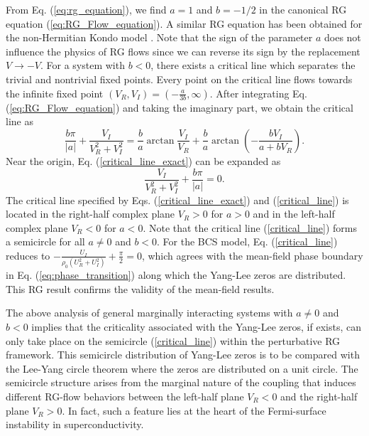 \documentclass[aps,prl,twocolumn,superscriptaddress]{revtex4-1}
\begin{document}
From Eq. (\ref{eq:rg_equation}), we find $a=1$ and $b=-1/2$ in
the canonical RG equation (\ref{eq:RG_Flow_equation}). A similar RG
equation has been obtained for the non-Hermitian Kondo model \cite{Nakagawa2018}.
Note that the sign of the parameter $a$ does not influence the physics
of RG flows since we can reverse its sign by the replacement $V\to-V$.
For a system with $b<0$, there exists a critical line which separates
the trivial and nontrivial fixed points. Every point on the critical
line flows towards the infinite fixed point $(V_{R},V_{I})=(-\frac{a}{3b},\infty)$.
After integrating Eq. (\ref{eq:RG_Flow_equation}) and taking the
imaginary part, we obtain the critical line as
\begin{equation}
\frac{b\pi}{|a|}+\frac{V_{I}}{V_{R}^{2}+V_{I}^{2}}=\frac{b}{a}\arctan{\frac{V_{I}}{V_{R}}}+\frac{b}{a}\arctan{(-\frac{bV_{I}}{a+bV_{R}})}.\label{critical_line_exact}
\end{equation}
Near the origin, Eq. (\ref{critical_line_exact}) can be expanded
as 
\begin{equation}
\frac{V_{I}}{V_{R}^{2}+V_{I}^{2}}+\frac{b\pi}{|a|}=0.\label{critical_line}
\end{equation}
The critical line specified by Eqs. (\ref{critical_line_exact}) and (\ref{critical_line})
is located in the right-half complex plane $V_{R}>0$ for $a>0$ and in the left-half complex plane $V_{R}<0$ for $a<0$. Note that the critical line (\ref{critical_line})
forms a semicircle for all $a\neq0$ and $b<0$. For the BCS model,
Eq. (\ref{critical_line}) reduces to $-\frac{U_{I}}{\rho_{0}(U_{R}^{2}+U_{I}^{2})}+\frac{\pi}{2}=0$,
which agrees with the mean-field phase boundary in Eq. (\ref{eq:phase_transition})
along which the Yang-Lee zeros are distributed. This RG result confirms the validity
of the mean-field results. 

The above analysis of general marginally interacting systems with $a\neq0$
and $b<0$ implies that the criticality associated with the Yang-Lee
zeros, if exists, can only take place on the semicircle (\ref{critical_line})
within the perturbative RG framework. This semicircle distribution
of Yang-Lee zeros is to be compared with the Lee-Yang circle theorem \cite{PhysRev.87.410}
where the zeros are distributed on a unit circle. The semicircle structure
arises from the marginal nature of the coupling that induces different
RG-flow behaviors between the left-half plane $V_{R}<0$ and the right-half plane $V_{R}>0$. In fact, such a feature lies at the heart of the Fermi-surface instability in superconductivity. %
\end{document}
